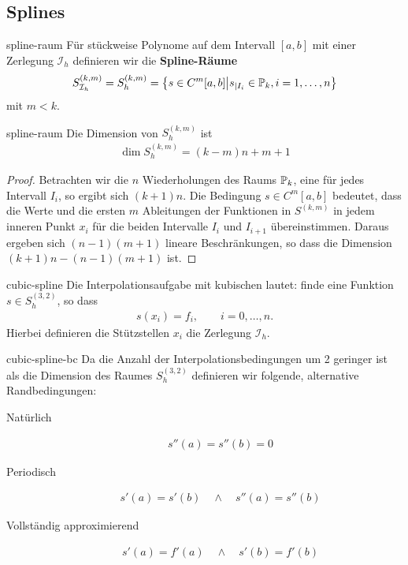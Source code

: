 \subsection{Splines}

\begin{Definition}{spline-raum}
  Für stückweise Polynome auf dem Intervall $[a,b]$ mit einer
  Zerlegung $\mathcal I_h$ definieren wir die
  \textbf{Spline-Räume}
  \begin{gather}
    S^{(k,m)}_{\mathcal I_h}
    = S^{(k,m)}_h
    = \bigl\{ s\in C^m[a,b]
    \big| s_{|I_i} \in \P_k, i=1,\dots,n\bigr\}
  \end{gather}
  mit $m<k$.
\end{Definition}

\begin{Lemma}{spline-raum}
  Die Dimension von $S^{(k,m)}_h$ ist
  \begin{gather}
    \operatorname{dim}S^{(k,m)}_h = (k-m)n + m+1
  \end{gather}
\end{Lemma}

\begin{proof}
  Betrachten wir die $n$ Wiederholungen des Raums $\P_k$, eine für
  jedes Intervall $I_i$, so ergibt sich $(k+1)n$.  Die Bedingung
  $s\in C^m[a,b]$ bedeutet, dass die Werte und die ersten $m$
  Ableitungen der Funktionen in $S^{(k,m)}$ in jedem inneren Punkt
  $x_i$ für die beiden Intervalle $I_i$ und $I_{i+1}$
  übereinstimmen. Daraus ergeben sich $(n-1)(m+1)$ lineare
  Beschränkungen, so dass die Dimension $(k+1)n - (n-1)(m+1)$ ist.
\end{proof}

\begin{Definition}{cubic-spline}
  Die Interpolationsaufgabe mit kubischen  lautet:
  finde eine Funktion $s\in S_h^{(3,2)}$, so dass
  \begin{gather}
    s(x_i) = f_i,\qquad i=0,\dots,n.
  \end{gather}
  Hierbei definieren die Stützstellen $x_i$ die Zerlegung $\mathcal I_h$.
\end{Definition}

\begin{Definition}{cubic-spline-bc}
  Da die Anzahl der Interpolationsbedingungen um 2 geringer ist als
  die Dimension des Raumes $S_h^{(3,2)}$ definieren wir folgende,
  alternative Randbedingungen:
  \begin{description}
  \item[Natürlich]
    \begin{gather}
      s''(a) = s''(b) = 0
    \end{gather}
  \item[Periodisch]
    \begin{gather}
      s'(a) = s'(b) \quad \wedge \quad s''(a) = s''(b)
    \end{gather}
  \item[Vollständig approximierend]
    \begin{gather}
      s'(a) = f'(a) \quad \wedge \quad s'(b) = f'(b)
    \end{gather}
  \end{description}
\end{Definition}


